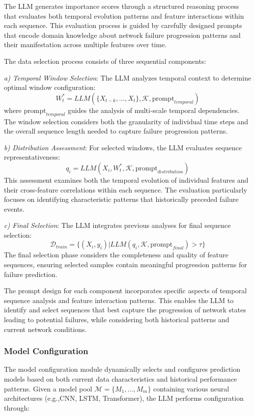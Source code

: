 \documentclass[conference]{IEEEtran}
\begin{document}
The LLM generates importance scores through a structured reasoning process that evaluates both temporal evolution patterns and feature interactions within each sequence. This evaluation process is guided by carefully designed prompts that encode domain knowledge about network failure progression patterns and their manifestation across multiple features over time.

The data selection process consists of three sequential components:

\textit{a) Temporal Window Selection}: The LLM analyzes temporal context to determine optimal window configuration:
\begin{equation}
    W_t^* = LLM(\{X_{t-k}, ..., X_t\}, \mathcal{K}, \text{prompt}_{temporal})
\end{equation}
where $\text{prompt}_{temporal}$ guides the analysis of multi-scale temporal dependencies. The window selection considers both the granularity of individual time steps and the overall sequence length needed to capture failure progression patterns.

\textit{b) Distribution Assessment}: For selected windows, the LLM evaluates sequence representativeness:
\begin{equation}
    q_i = LLM(X_i, W_t^*, \mathcal{K}, \text{prompt}_{distribution})
\end{equation}
This assessment examines both the temporal evolution of individual features and their cross-feature correlations within each sequence. The evaluation particularly focuses on identifying characteristic patterns that historically preceded failure events.

\textit{c) Final Selection}: The LLM integrates previous analyses for final sequence selection:
\begin{equation}
    \mathcal{D}_{train} = \{(X_i, y_i) | LLM(q_i, \mathcal{K}, \text{prompt}_{final}) > \tau\}
\end{equation}
The final selection phase considers the completeness and quality of feature sequences, ensuring selected samples contain meaningful progression patterns for failure prediction.

The prompt design for each component incorporates specific aspects of temporal sequence analysis and feature interaction patterns. This enables the LLM to identify and select sequences that best capture the progression of network states leading to potential failures, while considering both historical patterns and current network conditions.

\subsubsection{Model Configuration}
The model configuration module dynamically selects and configures prediction models based on both current data characteristics and historical performance patterns. Given a model pool $\mathcal{M} = \{M_1, ..., M_m\}$ containing various neural architectures (e.g.,CNN, LSTM, Transformer), the LLM performs configuration through:
\end{document}
